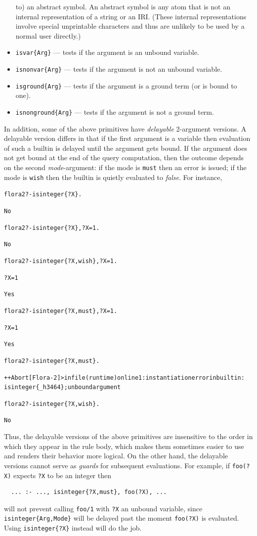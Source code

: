 \documentclass[11pt]{article}
\newcommand{\prompt}{flora2 ?- }
\newcommand{\errorsystem}{Flora-2}
\begin{document}
\begin{itemize}
  to) an abstract symbol. An abstract symbol is any atom that is not an
  internal representation of a string or an IRI. (These internal
  representations involve special unprintable characters and thus are
  unlikely to be used by a normal user directly.)
\item \texttt{isvar\{Arg\}} --- tests if the argument is an unbound variable.
\item \texttt{isnonvar\{Arg\}} --- tests if the argument is not an unbound variable.
\item \texttt{isground\{Arg\}} --- tests if the argument is a ground term (or
  is bound to one).
\item \texttt{isnonground\{Arg\}} --- tests if the argument is not a ground term.
\end{itemize}

In addition, some of the above primitives have \emph{delayable} 2-argument
versions. A delayable version differs in that if the first argument is a
variable then evaluation of such a builtin is delayed until the argument
gets bound. If the argument does not get bound at the end of the query
computation, then the outcome depends on the second \emph{mode}-argument:
if the mode is
\texttt{must} then an error is issued; if the mode is \texttt{wish} then the
builtin is quietly evaluated to \emph{false}.  For instance,
\begin{alltt}
\prompt isinteger\{?X\}.

No

\prompt isinteger\{?X\}, ?X=1.

No

\prompt isinteger\{?X,wish\}, ?X=1.

?X = 1

Yes

\prompt isinteger\{?X,must\}, ?X=1.

?X = 1

Yes

\prompt isinteger\{?X,must\}.

++Abort[\errorsystem]> in file (runtime) on line 1: instantiation error in builtin:
                isinteger\{_h3464\}; unbound argument

\prompt isinteger\{?X,wish\}.

No
\end{alltt}
Thus, the delayable versions of the above primitives are insensitive to the
order in which they appear in the rule body, which makes them sometimes
easier to use and renders their behavior more logical. On the other hand, the
delayable versions cannot serve as \emph{guards} for subsequent
evaluations. For example, if \texttt{foo(?X)} expects \texttt{?X} to be
an integer then
\begin{verbatim}
  ... :- ..., isinteger{?X,must}, foo(?X), ...
\end{verbatim}
will not prevent calling \texttt{foo/1} with \texttt{?X} an unbound
variable,
since \texttt{isinteger\{Arg,Mode\}} will be delayed past the moment
\texttt{foo(?X)} is evaluated. Using \texttt{isinteger\{?X\}} instead will
do the job.
\end{document}
